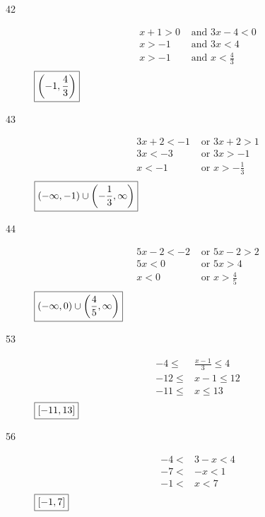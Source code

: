 \documentclass[letterpaper, landscape]{exam}
\begin{document}
\begin{description}
      \item[42]
        \begin{align*}
          x + 1 > 0 & \text{ and } 3x - 4 < 0 \\
          x > -1    & \text{ and } 3x < 4 \\
          x > -1    & \text{ and } x < \frac{4}{3} \\
        \end{align*}
        $\boxed{ \intoo{ -1, \frac{4}{3} } }$

      \item[43]
        \begin{align*}
          3x + 2 < -1 & \text{ or } 3x + 2 > 1 \\
          3x < -3     & \text{ or } 3x > -1 \\
          x < -1      & \text{ or } x > - \frac{1}{3} \\
        \end{align*}
        $\boxed{ \intoo{ -\infty, -1 } \cup \intoo{ -\frac{1}{3}, \infty } }$

      \item[44]
        \begin{align*}
          5x - 2 < -2 & \text{ or } 5x - 2 > 2 \\
          5x < 0      & \text{ or } 5x > 4 \\
          x < 0       & \text{ or } x > \frac{4}{5} \\
        \end{align*}
        $\boxed{ \intoo{ -\infty, 0 } \cup \intoo{ \frac{4}{5}, \infty } }$

      \item[53]
        \begin{align*}
          -4 \leq  & \frac{x - 1}{3} \leq 4 \\
          -12 \leq & x - 1           \leq 12 \\
          -11 \leq & x               \leq 13 \\
        \end{align*}
        $\boxed{ \intcc{ -11, 13 } }$

      \item[56]
        \begin{align*}
          -4 < & 3 - x < 4 \\
          -7 < & -x    < 1 \\
          -1 < & x     < 7 \\
        \end{align*}
        $\boxed{ \intcc{ -1, 7 } }$


\end{description}
\end{document}
